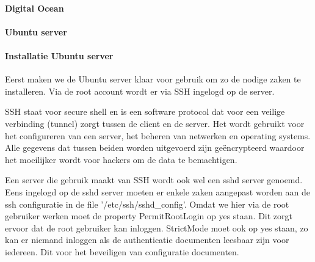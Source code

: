             \paragraph{Digital Ocean}
            
            \paragraph{Ubuntu server}
            
            \paragraph{Installatie Ubuntu server}
            Eerst maken we de Ubuntu server klaar voor gebruik om zo de nodige zaken te installeren.
            Via de root account wordt er via SSH ingelogd op de server. 
            
            SSH staat voor secure shell en is een software protocol dat voor een veilige verbinding (tunnel) zorgt tussen de client en de server. Het wordt gebruikt voor het configureren van een server, het beheren van netwerken en operating systems. Alle gegevens dat tussen beiden worden uitgevoerd zijn geëncrypteerd waardoor het moeilijker wordt voor hackers om de data te bemachtigen.
            
            Een server die gebruik maakt van SSH wordt ook wel een sshd server genoemd. Eens ingelogd op de sshd server moeten er enkele zaken aangepast worden aan de ssh configuratie in de file '/etc/ssh/sshd\_config'. Omdat we hier via de root gebruiker werken moet de property PermitRootLogin op yes staan. Dit zorgt ervoor dat de root gebruiker kan inloggen.
            StrictMode moet ook op yes staan, zo kan er niemand inloggen als de authenticatie documenten leesbaar zijn voor iedereen. Dit voor het beveiligen van configuratie documenten. %
            
